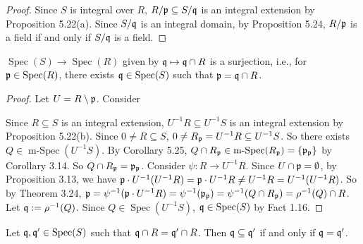 \begin{proof}
    Since $S$ is integral over $R$, $R/\mathfrak{p} \subseteq S/\mathfrak{q}$ is an integral extension by Proposition 5.22(a). Since $S/\mathfrak{q}$ is an integral domain, by Proposition 5.24, $R/\mathfrak{p}$ is a field if and only if $S/\mathfrak{q}$ is a field.
\end{proof}

\begin{theorem}
    $\operatorname{Spec}(S) \to \operatorname{Spec}(R)$ given by $\mathfrak{q} \mapsto \mathfrak{q} \cap R$ is a surjection, i.e., for $\mathfrak{p} \in \operatorname{Spec}(R)$, there exists $\mathfrak{q} \in \operatorname{Spec}(S)$ such that $\mathfrak{p} = \mathfrak{q} \cap R$.
\end{theorem}

\begin{proof}
    Let $U = R \setminus \mathfrak{p}$. Consider
    \begin{center}
    \end{center}
    Since $R \subseteq S$ is an integral extension, $U^{-1}R \subseteq U^{-1}S$ is an integral extension by Proposition 5.22(b). Since $0 \neq R \subseteq S$, $0 \neq R_{\mathfrak{p}} = U^{-1}R \subseteq U^{-1}S$. So there exists $Q \in \operatorname{m-Spec}(U^{-1}S)$. By Corollary 5.25, $Q \cap R_{\mathfrak{p}}\in \operatorname{m-Spec}(R_{\mathfrak{p}}) = \{\mathfrak{p}_{\mathfrak{p}}\}$ by Corollary 3.14. So $Q \cap R_{\mathfrak{p}} = \mathfrak{p}_{\mathfrak{p}}$. Consider $\psi: R \to U^{-1}R$. Since $U \cap \mathfrak{p} = \emptyset$, by Proposition 3.13, we have $\mathfrak{p} \cdot U^{-1}(U^{-1}R) = \mathfrak{p} \cdot U^{-1}R \neq U^{-1}R = U^{-1}(U^{-1}R)$. So by Theorem 3.24, $\mathfrak{p} = \psi^{-1}(\mathfrak{p} \cdot U^{-1}R) = \psi^{-1}(\mathfrak{p}_{\mathfrak{p}}) = \psi^{-1}(Q \cap R_{\mathfrak{p}}) = \rho^{-1}(Q) \cap R$. Let $\mathfrak{q} := \rho^{-1}(Q)$. Since $Q \in \operatorname{Spec}(U^{-1}S)$, $\mathfrak{q} \in \operatorname{Spec}(S)$ by Fact 1.16.
\end{proof}

\begin{proposition}
    Let $\mathfrak{q},\mathfrak{q}' \in \operatorname{Spec}(S)$ such that $\mathfrak{q} \cap R = \mathfrak{q}' \cap R$. Then $\mathfrak{q} \subseteq \mathfrak{q}'$ if and only if $\mathfrak{q} = \mathfrak{q}'$.
\end{proposition}


